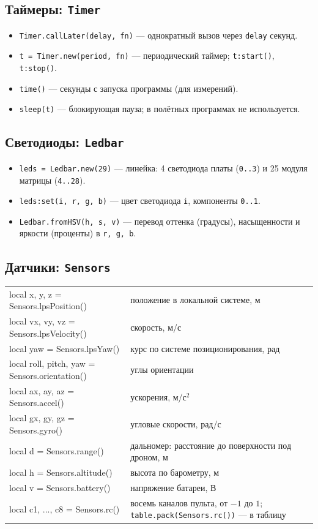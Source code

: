 \subsection{Таймеры: \texttt{Timer}}
\begin{itemize}
  \item \verb|Timer.callLater(delay, fn)| --- однократный вызов через \verb|delay| секунд.
  \item \verb|t = Timer.new(period, fn)| --- периодический таймер; \verb|t:start()|, \verb|t:stop()|.
  \item \verb|time()| --- секунды с запуска программы (для измерений).
  \item \verb|sleep(t)| --- блокирующая пауза; в полётных программах не используется.
\end{itemize}

\subsection{Светодиоды: \texttt{Ledbar}}
\begin{itemize}
  \item \verb|leds = Ledbar.new(29)| --- линейка: 4 светодиода платы (\verb|0..3|) и 25 модуля матрицы (\verb|4..28|).
  \item \verb|leds:set(i, r, g, b)| --- цвет светодиода \verb|i|, компоненты \verb|0..1|.
  \item \verb|Ledbar.fromHSV(h, s, v)| --- перевод оттенка (градусы), насыщенности и яркости (проценты) в \verb|r, g, b|.
\end{itemize}

\subsection{Датчики: \texttt{Sensors}}
\begin{center}\small
\begin{tabularx}{\linewidth}{@{}>{\ttfamily}l X@{}}
\toprule
local x, y, z = Sensors.lpsPosition() & положение в локальной системе, м \\
local vx, vy, vz = Sensors.lpsVelocity() & скорость, м/с \\
local yaw = Sensors.lpsYaw() & курс по системе позиционирования, рад \\
local roll, pitch, yaw = Sensors.orientation() & углы ориентации \\
local ax, ay, az = Sensors.accel() & ускорения, м/с$^2$ \\
local gx, gy, gz = Sensors.gyro() & угловые скорости, рад/с \\
local d = Sensors.range() & дальномер: расстояние до поверхности под дроном, м \\
local h = Sensors.altitude() & высота по барометру, м \\
local v = Sensors.battery() & напряжение батареи, В \\
local c1, ..., c8 = Sensors.rc() & восемь каналов пульта, от $-1$ до $1$; \texttt{table.pack(Sensors.rc())} --- в таблицу \\
\bottomrule
\end{tabularx}
\end{center}

